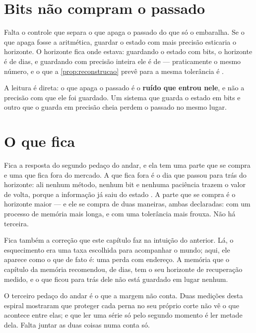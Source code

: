 \section{Bits não compram o passado}

Falta o controle que separa o que apaga o passado do que só o embaralha. Se o que apaga fosse a
aritmética, guardar o estado com mais precisão esticaria o horizonte. O horizonte fica onde estava: guardando o estado
com \numApagadoBitsMenor{} bits, o horizonte é de \numApagadoHorizonteDeBits{} dias, e guardando com
precisão inteira ele é de \numApagadoHorizonteSemBits{} --- praticamente o mesmo número, e o que a
\cref{prop:reconstrucao} prevê para a mesma tolerância é \numApagadoHorizonteDaFormula{}.

A leitura é direta: o que apaga o passado é o \textbf{ruído que entrou nele}, e não a precisão com que
ele foi guardado. Um sistema que guarda o estado em \numApagadoBitsMenor{} bits e outro que o guarda em precisão cheia
perdem o passado no mesmo lugar.

\section{O que fica}

Fica a resposta do segundo pedaço do andar, e ela tem uma parte que se compra e uma que fica fora do
mercado. A que fica fora é o dia que passou para trás do horizonte: ali nenhum método, nenhum bit e
nenhuma paciência trazem o valor de volta, porque a informação já saiu do estado \cite{cover2006elements}. A parte que se compra é
o horizonte maior --- e ele se compra de duas maneiras, ambas declaradas: com um processo de memória
mais longa, e com uma tolerância mais frouxa. Não há terceira.

Fica também a correção que este capítulo faz na intuição do anterior. Lá, o esquecimento era uma
taxa escolhida para acompanhar o mundo; aqui, ele aparece como o que de fato é: uma perda com
endereço. A memória que o capítulo da memória recomendou, de \numEsquecimentoMelhorMemoria{} dias, tem o seu horizonte de
recuperação medido, e o que ficou para trás dele não está guardado em lugar nenhum.

O terceiro pedaço do andar é o que a margem não conta. Duas medições desta espiral mostraram que proteger
cada perna no seu próprio corte não vê o que acontece entre elas; e que ler uma série só pelo
segundo momento é ler metade dela. Falta juntar as duas coisas numa conta só.
